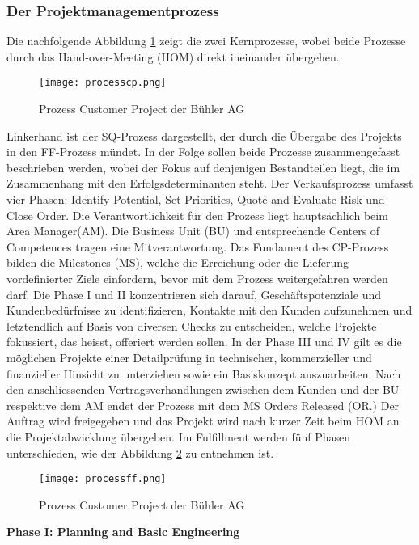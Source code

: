 \subsubsection{Der Projektmanagementprozess}\label{zweieins}
Die nachfolgende Abbildung \ref{fig: processcp} zeigt die zwei Kernprozesse, wobei beide Prozesse durch das Hand-over-Meeting (HOM) direkt ineinander übergehen. 
\begin{figure}[H]
	\centering
	\texttt{[image: processcp.png]}
	\caption{Prozess Customer Project der Bühler AG}
	\label{fig: processcp}
\end{figure}
Linkerhand ist der SQ-Prozess dargestellt, der durch die Übergabe des Projekts in den FF-Prozess mündet. In der Folge sollen beide Prozesse zusammengefasst beschrieben werden, wobei der Fokus auf denjenigen Bestandteilen liegt, die im Zusammenhang mit den Erfolgsdeterminanten steht. Der Verkaufsprozess umfasst vier Phasen: Identify Potential, Set Priorities, Quote and Evaluate Risk und Close Order. Die Verantwortlichkeit für den Prozess liegt hauptsächlich beim Area Manager(AM). Die Business Unit (BU) und entsprechende Centers of Competences tragen eine Mitverantwortung. Das Fundament des CP-Prozess bilden die Milestones (MS), welche die Erreichung oder die Lieferung vordefinierter Ziele einfordern, bevor mit dem Prozess weitergefahren werden darf. Die Phase I und II konzentrieren sich darauf, Geschäftspotenziale und Kundenbedürfnisse zu identifizieren, Kontakte mit den Kunden aufzunehmen und letztendlich auf Basis von diversen Checks zu entscheiden,  welche Projekte fokussiert, das heisst, offeriert werden sollen. In der Phase III und IV gilt es die möglichen Projekte einer Detailprüfung in technischer, kommerzieller und finanzieller Hinsicht zu unterziehen sowie ein Basiskonzept auszuarbeiten. Nach den anschliessenden Vertragsverhandlungen zwischen dem Kunden und der BU respektive dem AM endet der Prozess mit dem MS Orders Released (OR.) Der Auftrag wird freigegeben und das Projekt wird nach kurzer Zeit beim HOM an die Projektabwicklung übergeben. Im Fulfillment werden fünf Phasen unterschieden, wie der Abbildung \ref{fig: processff} zu entnehmen ist.
\begin{figure}[H]
	\centering
	\texttt{[image: processff.png]}
	\caption{Prozess Customer Project der Bühler AG}
	\label{fig: processff}
\end{figure}
\textbf{Phase I: Planning and Basic Engineering}
\newline
